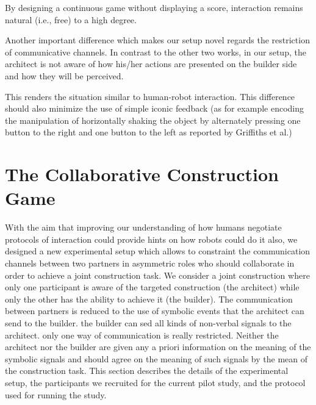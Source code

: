 By designing a continuous game without displaying a score, interaction remains natural (i.e., free) to a high degree. 

Another important difference which makes our setup novel regards the restriction of communicative channels. In contrast to the other two works, in our setup, the architect is not aware of how his/her actions are presented on the builder side and how they will be perceived. 

This renders the situation similar to human-robot interaction.
This difference should also minimize the use of simple iconic feedback (as for example encoding the manipulation of horizontally shaking the object by alternately pressing one button to the right and one button to the left as reported by Griffiths et al.)


\section{The Collaborative Construction Game}

With the aim that improving our understanding of how humans negotiate protocols of interaction could provide hints on how robots could do it also, we designed a new experimental setup which allows to constraint the communication channels between two partners in asymmetric roles who should collaborate in order to achieve a joint construction task. 
We consider a joint construction where only one participant is aware of the targeted construction (the architect) while only the other has the ability to achieve it (the builder). The communication between partners is reduced to the use of symbolic events that the architect can send to the builder. 
the builder can sed all kinds of non-verbal signals to the architect. only one way of communication is really restricted. Neither the architect nor the builder are given any a priori information on the meaning of the symbolic signals and should agree on the meaning of such signals by the mean of the construction task.
This section describes the details of the experimental setup, the participants we recruited for the current pilot study, and the protocol used for running the study.

